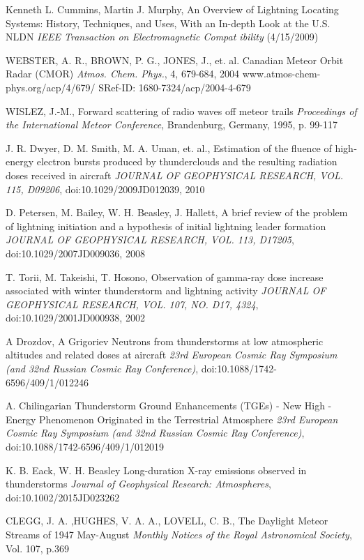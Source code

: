 \documentclass[twoside]{ctuthesis}
\theoremstyle{plain}
\theoremstyle{definition}
\theoremstyle{note}
\begin{document}
\begin{thebibliography}{99}
Kenneth L. Cummins, Martin J. Murphy,
An Overview of Lightning Locating Systems: History, Techniques, and Uses, With an In-depth Look at 
the U.S. NLDN \emph{IEEE Transaction on Electromagnetic Compat
ibility} (4/15/2009)


WEBSTER, A. R., BROWN, P. G., JONES, J., et. al.
Canadian Meteor Orbit Radar (CMOR)
\emph{Atmos. Chem. Phys.}, 4, 679-684, 2004
www.atmos-chem-phys.org/acp/4/679/
SRef-ID: 1680-7324/acp/2004-4-679

WISLEZ, J.-M.,
Forward scattering of radio waves off meteor trails
\emph{Proceedings of the International Meteor Conference}, Brandenburg, Germany, 1995, p. 99-117

J. R. Dwyer, D. M. Smith, M. A. Uman, et. al.,
Estimation of the fluence of high‐energy electron bursts produced by thunderclouds and the resulting radiation doses received in aircraft
\emph{JOURNAL OF GEOPHYSICAL RESEARCH, VOL. 115, D09206}, doi:10.1029/2009JD012039, 2010

D. Petersen, M. Bailey, W. H. Beasley, J. Hallett,
A brief review of the problem of lightning initiation and a hypothesis of initial lightning leader formation
\emph{JOURNAL OF GEOPHYSICAL RESEARCH, VOL. 113, D17205}, doi:10.1029/2007JD009036, 2008

T. Torii, M. Takeishi, T. Hosono,
Observation of gamma-ray dose increase associated with winter thunderstorm and lightning activity
\emph{JOURNAL OF GEOPHYSICAL RESEARCH, VOL. 107, NO. D17, 4324}, doi:10.1029/2001JD000938, 2002

A Drozdov, A Grigoriev
Neutrons from thunderstorms at low atmospheric altitudes and related doses at aircraft
\emph{23rd European Cosmic Ray Symposium (and 32nd Russian Cosmic Ray Conference)}, doi:10.1088/1742-6596/409/1/012246

A. Chilingarian
Thunderstorm Ground Enhancements (TGEs) - New High - Energy Phenomenon Originated in the Terrestrial Atmosphere
\emph{23rd European Cosmic Ray Symposium (and 32nd Russian Cosmic Ray Conference)}, doi:10.1088/1742-6596/409/1/012019

K. B. Eack, W. H. Beasley
Long-duration X-ray emissions observed in thunderstorms
\emph{Journal of Geophysical Research: Atmospheres}, doi:10.1002/2015JD023262

CLEGG, J. A. ,HUGHES,  V. A. A., LOVELL, C. B., 
The Daylight Meteor Streams of 1947 May-August
\emph{Monthly Notices of the Royal Astronomical Society}, Vol. 107, p.369


\end{thebibliography}
\end{document}
